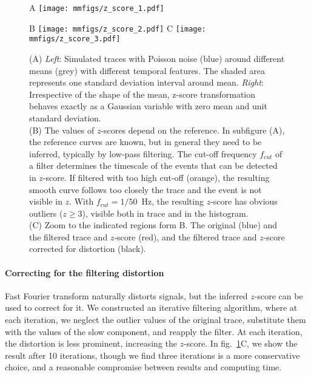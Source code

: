 \documentclass[a4paper,11pt,oneside,]{article}
\begin{document}
\begin{figure}[t]
    \centering
    \begin{minipage}{.49\textwidth}
        {\selectfont A} \texttt{[image: mmfigs/z\_score\_1.pdf]}
    \end{minipage}
    \begin{minipage}{.49\textwidth} 
        {\selectfont B} \texttt{[image: mmfigs/z\_score\_2.pdf]}
        {\selectfont C} \texttt{[image: mmfigs/z\_score\_3.pdf]}
    \end{minipage}
    \caption{
    (A) \emph{Left}: Simulated traces with Poisson noise (blue) around different means (grey) with different temporal features. The shaded area represents one standard deviation interval around mean. 
    \emph{Right}: Irrespective of the shape of the mean, z-score transformation behaves exactly as a Gaussian variable with zero mean and unit standard deviation.\\
    (B) The values of $z$-scores depend on the reference. In subfigure (A), the reference curves are known, but in general they need to be inferred, typically by low-pass filtering. The cut-off frequency $f_{cut}$ of a filter determines the timescale of the events that can be detected in $z$-score. If filtered with too high cut-off (orange), the resulting smooth curve follows too closely the trace and the event is not visible in $z$. With $f_{cut}=1/50$~Hz, the resulting $z$-score has obvious outliers ($z\geq 3$), visible both in trace and in the histogram.\\
    (C) Zoom to the indicated regions form B. The original (blue) and the filtered trace and $z$-score (red), and the filtered trace and $z$-score corrected for distortion (black).
    \label{fig:z_score}
    }
\end{figure}


\paragraph{Correcting for the filtering distortion} 
Fast Fourier transform naturally distorts signals, but the inferred $z$-score can be used to correct for it. We constructed an iterative filtering algorithm, where at each iteration, we neglect the outlier values of the original trace, substitute them with the values of the slow component, and reapply the filter. At each iteration, the distortion is less prominent, increasing the $z$-score.
In fig.~\ref{fig:z_score}C, we show the result after 10 iterations, though we find three iterations is a more conservative choice, and a reasonable compromise between results and computing time.
\end{document}
